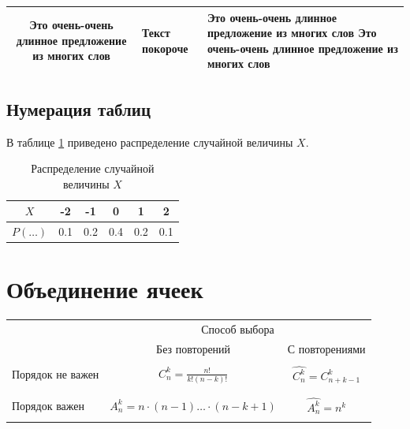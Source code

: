 \documentclass[12pt, a4paper]{article}
\begin{document}

\vspace{20mm}


\begin{tabulary}{\textwidth}{|C|J|L|}
	\hline
	Это очень-очень длинное предложение из многих слов & Текст покороче & Это очень-очень длинное предложение из многих слов Это очень-очень длинное предложение из многих слов \\
	\hline
\end{tabulary}



\subsection{Нумерация таблиц}

В таблице \ref{tab:random} приведено распределение случайной величины $X$.

\begin{table}[h!]
\begin{center}
\begin{tabular}{|c|c|c|c|c|c|}
\hline
$X$ & -2 & -1 & 0 & 1 & 2 \\
\hline
$P(\ldots)$ & 0.1 & 0.2 & 0.4 & 0.2 & 0.1 \\
\hline
\end{tabular}
\caption{Распределение случайной величины $X$}\label{tab:random}
\end{center}
\end{table}




\section{Объединение ячеек}

\begin{center}
\begin{tabular}{ |l|c|c| }
\hline
 & \multicolumn{2}{|c|}{Способ выбора} \\
\cline{2-3}
 & Без повторений & С повторениями  \\ \hline
\multirow{3}{*}{Порядок не важен}
                & & \\
                & $ C_n^{k} = \frac{n!}{k!(n-k)!} $ & $ \hat{C_n^k} = C_{n+k-1}^k $ \\
                & & \\

\hline
\multirow{3}{*}{Порядок важен}
               & & \\
               & $ A_n^{k} = n \cdot (n-1) \ldots \cdot (n-k+1) $ & $ \hat{A_n^k} = n^k $ \\
               & & \\
\hline
\end{tabular}
\end{center}
\end{document}

